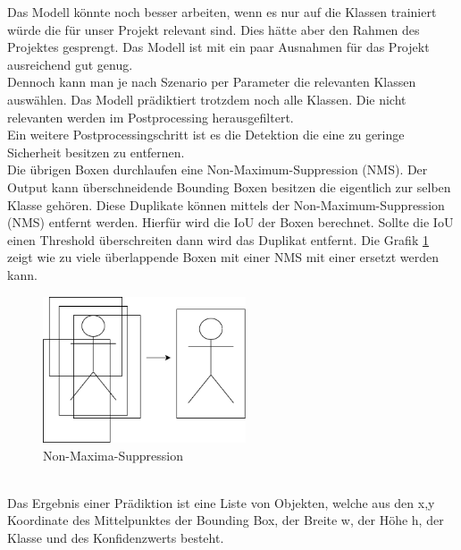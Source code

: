 \documentclass[conference]{IEEEtran}
\begin{document}
	Das Modell könnte noch besser arbeiten, wenn es nur auf die Klassen trainiert würde die für unser Projekt relevant sind. Dies hätte aber den Rahmen des Projektes gesprengt. Das Modell ist mit ein paar Ausnahmen für das Projekt ausreichend gut genug.\\
	Dennoch kann man je nach Szenario per Parameter die relevanten Klassen auswählen. Das Modell prädiktiert trotzdem noch alle Klassen. Die nicht relevanten werden im Postprocessing herausgefiltert.\\
	Ein weitere Postprocessingschritt ist es die Detektion die eine zu geringe Sicherheit besitzen zu entfernen.\\
	Die übrigen Boxen durchlaufen eine Non-Maximum-Suppression (NMS)\cite{nms}.
	Der Output kann überschneidende Bounding Boxen besitzen die eigentlich zur selben Klasse gehören. Diese Duplikate können mittels der Non-Maximum-Suppression (NMS) entfernt werden. Hierfür wird die IoU der Boxen berechnet. Sollte die IoU einen Threshold überschreiten dann wird das Duplikat entfernt. Die Grafik \ref{NMS} zeigt wie zu viele überlappende Boxen mit einer NMS mit einer ersetzt werden kann.\\
	\begin{figure}[!h]
		\begin{center}
			\includegraphics[width=6cm]{Media/NMS.png}
			\caption{Non-Maxima-Suppression}
			\label{NMS}
		\end{center}
	\end{figure}\\
	Das Ergebnis einer Prädiktion ist eine Liste von Objekten, welche aus den x,y Koordinate des Mittelpunktes der Bounding Box, der Breite w, der Höhe h, der Klasse und des Konfidenzwerts besteht.
	
\end{document}

